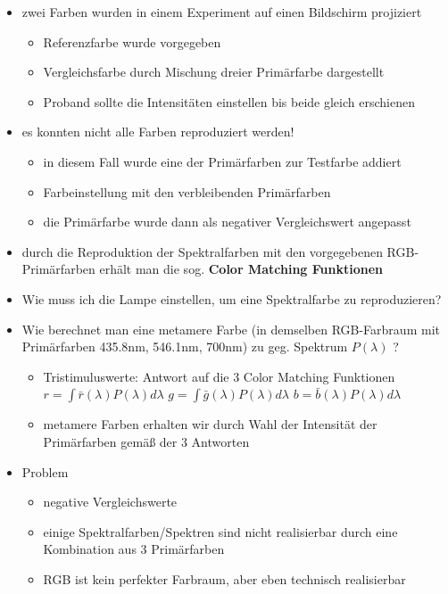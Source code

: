 \documentclass[paper=a4, fontsize=11pt]{scrartcl} %
\numberwithin{equation}{section} %
\numberwithin{figure}{section} %
\numberwithin{table}{section} %
\begin{document}
\begin{itemize}
\item zwei Farben wurden in einem Experiment auf einen Bildschirm projiziert
\begin{itemize}
\item Referenzfarbe wurde vorgegeben
\item Vergleichsfarbe durch Mischung dreier Primärfarbe dargestellt
\item Proband sollte die Intensitäten einstellen bis beide gleich erschienen
\end{itemize}
\item es konnten nicht alle Farben reproduziert werden!
\begin{itemize}
\item in diesem Fall wurde eine der Primärfarben zur Testfarbe addiert
\item Farbeinstellung mit den verbleibenden Primärfarben
\item die Primärfarbe wurde dann als negativer Vergleichswert angepasst
\end{itemize}
\item durch die Reproduktion der Spektralfarben mit den vorgegebenen RGB-Primärfarben erhält man die sog. \textbf{Color Matching Funktionen}
\item \glqq Wie muss ich die Lampe einstellen, um eine Spektralfarbe zu reproduzieren?\grqq
\item Wie berechnet man eine metamere Farbe (in demselben RGB-Farbraum mit Primärfarben 435.8nm, 546.1nm, 700nm) zu geg. Spektrum $P(\lambda)$ ?
\begin{itemize}
\item Tristimuluswerte: Antwort auf die 3 Color Matching Funktionen $r = \int \bar{r}(\lambda)P(\lambda)d\lambda$ $g = \int \bar{g}(\lambda)P(\lambda)d\lambda$ $b = \bar{b}(\lambda) P (\lambda)d\lambda$
\item metamere Farben erhalten wir durch Wahl der Intensität der Primärfarben gemäß der 3 Antworten
\end{itemize}
\item Problem
\begin{itemize}
\item negative Vergleichswerte
\item einige Spektralfarben/Spektren sind nicht realisierbar durch eine Kombination aus 3 Primärfarben
\item RGB ist kein perfekter Farbraum, aber eben technisch realisierbar
\end{itemize}
\end{itemize}
\end{document}
